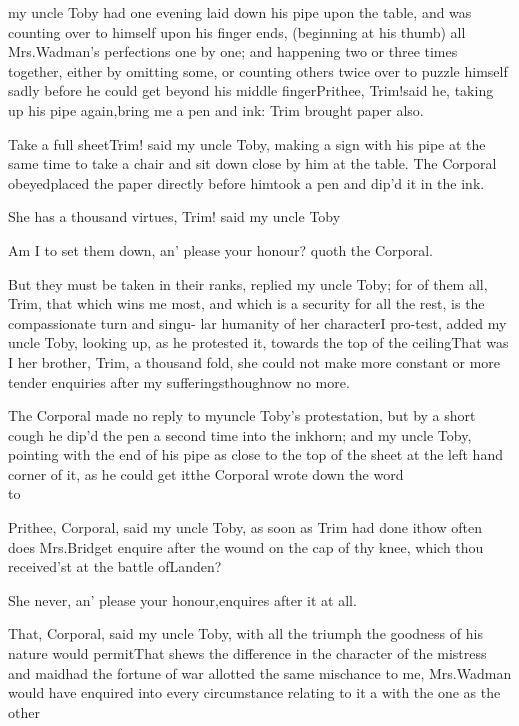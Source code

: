 \documentclass[twoside]{article}
\begin{document}
 my uncle Toby had one
evening laid down his pipe upon\break 
the table, and was counting over to
himself upon his finger ends, (beginning at his thumb) all 
Mrs.\@ Wadman’s perfections one by one; and happening two or
three times together, either by omitting some, or counting
others twice over to puzzle himself sadly before he could get
beyond his middle finger\tsh Pri\-thee, Trim!\@ said
he, taking up his pipe\break 
again,\thinspace\tsh bring me a pen and ink:\break
Trim brought paper also.

\vfill{}\eject

Take a full sheet\tsh Trim! said my uncle
Toby, making a sign with his pipe at the same time to take a
chair and sit down close by him at the table. The Corporal
obeyed\tsh placed the paper directly before
him\tsh took a pen and dip’d it in the ink.

\tsk She has a thousand virtues, Trim! said my uncle
Toby\tsh

Am I to set them down, an’ please your honour? quoth the
Corporal.

\tsh But they must be taken in their ranks, replied my
uncle Toby; for of them all, Trim, that which wins me
most, and which is a security for all the rest, is the
compassionate turn and singu- lar humanity of her character\tsk I
pro-\break test, added my uncle Toby, looking up, as he protested
it, towards the top of the ceiling\tsk That was I her brother, Trim, a
thousand fold, she could not make more constant or more tender
enquiries after my sufferings\tsh though\break now no more.

The Corporal made no reply to my\break uncle Toby’s protestation, but by a short
cough \tsk
he dip’d the pen a second time into the inkhorn; and my uncle Toby, pointing with
the end of his pipe as close to the top of the sheet at the left hand corner of it,
as he could get it\tsh the Corporal wrote down the word\\ 
\hbox to 

Prithee, Corporal, said my uncle Toby, as soon as Trim had done it\tsh how often
does Mrs.\@ Bridget enquire after the wound on the cap of thy knee, which thou
received’st at the battle of\break Landen?

She never, an’ please your honour,\break enquires after it at all.

That, Corporal, said my uncle Toby, with all the triumph the goodness of his nature
would permit\tsh That shews the difference in the character of the mistress and
maid\tsh had the fortune of war allotted the same mischance to me, Mrs.\@ Wadman
would have enquired into every circumstance relating to it a
with the one as the other\tsh
\end{document}
